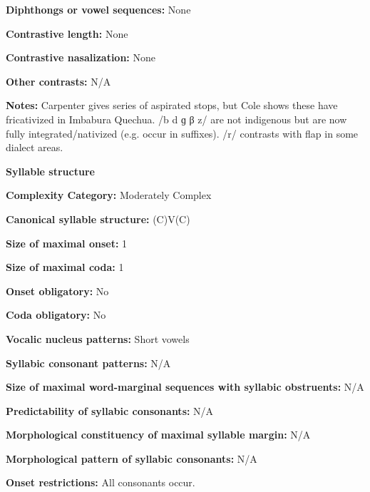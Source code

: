 \textbf{Diphthongs or vowel sequences:} None



\textbf{Contrastive length:} None



\textbf{Contrastive nasalization:} None



\textbf{Other contrasts:} N/A



\textbf{Notes:} Carpenter gives series of aspirated stops, but Cole shows these have fricativized in Imbabura Quechua. /b d ɡ β z/ are not indigenous but are now fully integrated/nativized (e.g. occur in suffixes). /r/ contrasts with flap in some dialect areas.



\textbf{Syllable structure}



\textbf{Complexity Category:} Moderately Complex



\textbf{Canonical syllable structure:} (C)V(C) \citep[203-5]{Cole1982}



\textbf{Size of maximal onset:} 1



\textbf{Size of maximal coda:} 1



\textbf{Onset obligatory:} No



\textbf{Coda obligatory:} No



\textbf{Vocalic nucleus patterns:} Short vowels



\textbf{Syllabic consonant patterns:} N/A



\textbf{Size of maximal word{}-marginal sequences with syllabic obstruents:} N/A



\textbf{Predictability of syllabic consonants:} N/A



\textbf{Morphological constituency of maximal syllable margin:} N/A



\textbf{Morphological pattern of syllabic consonants:} N/A



\textbf{Onset restrictions:} All consonants occur.



